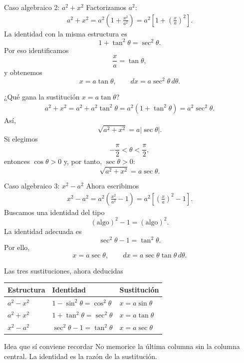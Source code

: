 \documentclass[10pt,aspectratio=169]{beamer}
\begin{document}
\begin{frame}{Caso algebraico 2: $a^2+x^2$}
Factorizamos $a^2$:
\begin{align*}
a^2+x^2=a^2\left(1+\frac{x^2}{a^2}\right)=a^2\left[1+\left(\frac{x}{a}\right)^2\right].
\end{align*}
La identidad con la misma estructura es
\[
1+\tan^2\theta=\sec^2\theta.
\]
Por eso identificamos
\[
\frac{x}{a}=\tan\theta,
\]
y obtenemos
\[
\boxed{x=a\tan\theta},\qquad \boxed{dx=a\sec^2\theta\,d\theta}.
\]
\end{frame}

\begin{frame}{¿Qué gana la sustitución $x=a\tan\theta$?}
\begin{align*}
a^2+x^2=a^2+a^2\tan^2\theta=a^2(1+\tan^2\theta)=a^2\sec^2\theta.
\end{align*}
Así,
\[
\sqrt{a^2+x^2}=a|\sec\theta|.
\]
Si elegimos
\[
-\frac{\pi}{2}<\theta<\frac{\pi}{2},
\]
entonces $\cos\theta>0$ y, por tanto, $\sec\theta>0$:
\[
\boxed{\sqrt{a^2+x^2}=a\sec\theta}.
\]
\end{frame}

\begin{frame}{Caso algebraico 3: $x^2-a^2$}
Ahora escribimos
\begin{align*}
x^2-a^2=a^2\left(\frac{x^2}{a^2}-1\right)=a^2\left[\left(\frac{x}{a}\right)^2-1\right].
\end{align*}
Buscamos una identidad del tipo
\[
(\text{algo})^2-1=(\text{algo})^2.
\]
La identidad adecuada es
\[
\sec^2\theta-1=\tan^2\theta.
\]
Por ello,
\[
\boxed{x=a\sec\theta},\qquad
\boxed{dx=a\sec\theta\tan\theta\,d\theta}.
\]
\end{frame}

\begin{frame}{Las tres sustituciones, ahora deducidas}
\centering
\renewcommand{\arraystretch}{1.55}
\begin{tabular}{>{\centering\arraybackslash}m{3cm}>{\centering\arraybackslash}m{4.4cm}>{\centering\arraybackslash}m{3.7cm}}
\toprule
Estructura & Identidad & Sustitución\\
\midrule
$a^2-x^2$ & $1-\sin^2\theta=\cos^2\theta$ & $x=a\sin\theta$\\
$a^2+x^2$ & $1+\tan^2\theta=\sec^2\theta$ & $x=a\tan\theta$\\
$x^2-a^2$ & $\sec^2\theta-1=\tan^2\theta$ & $x=a\sec\theta$\\
\bottomrule
\end{tabular}
\vspace{4mm}
\begin{alertblock}{Idea que sí conviene recordar}
No memorice la última columna sin la columna central. La identidad es la razón de la sustitución.
\end{alertblock}
\end{frame}
\end{document}
